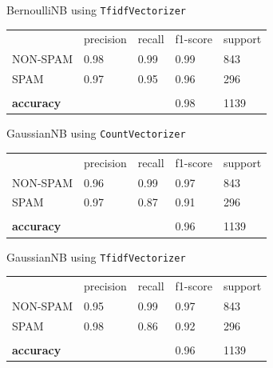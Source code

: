 BernoulliNB using \verb|TfidfVectorizer|
\begin{table}[H]
    \begin{tabular}{lllll}
        & precision & recall & f1-score                     & support \\
        NON-SPAM          & 0.98      & 0.99   & 0.99                         & 843     \\
        SPAM              & 0.97      & 0.95   & 0.96                         & 296     \\
        &           &        &                              &         \\
        \textbf{accuracy} &           &        & \cellcolor[HTML]{FFCCC9}0.98 & 1139
    \end{tabular}\label{tab:BernoulliNB_tfidf_vect}
\end{table}

GaussianNB using \verb|CountVectorizer|
\begin{table}[H]
    \begin{tabular}{lllll}
        & precision & recall & f1-score                     & support \\
        NON-SPAM          & 0.96      & 0.99   & 0.97                         & 843     \\
        SPAM              & 0.97      & 0.87   & 0.91                         & 296     \\
        &           &        &                              &         \\
        \textbf{accuracy} &           &        & \cellcolor[HTML]{FFCCC9}0.96 & 1139
    \end{tabular}\label{tab:GaussianNB_count_vect}
\end{table}

GaussianNB using \verb|TfidfVectorizer|
\begin{table}[H]
    \begin{tabular}{lllll}
        & precision & recall & f1-score                     & support \\
        NON-SPAM          & 0.95      & 0.99   & 0.97                         & 843     \\
        SPAM              & 0.98      & 0.86   & 0.92                         & 296     \\
        &           &        &                              &         \\
        \textbf{accuracy} &           &        & \cellcolor[HTML]{FFCCC9}0.96 & 1139
    \end{tabular}\label{tab:GaussianNB_tfidf_vect}
\end{table}

